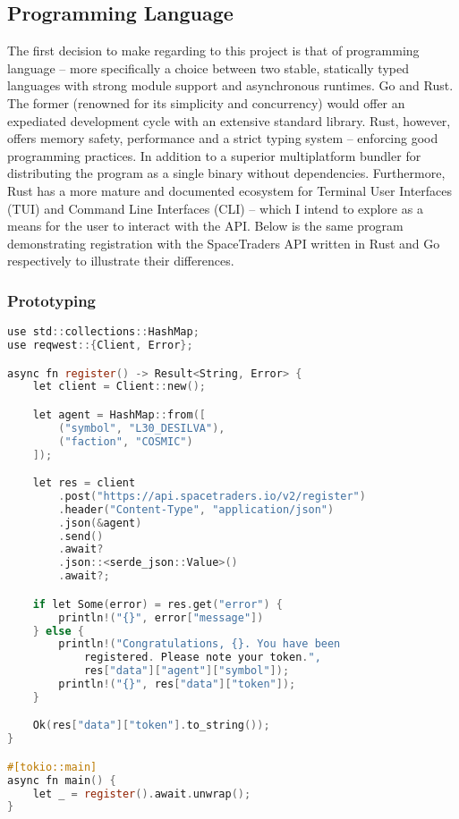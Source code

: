 \subsection{Programming Language}
The first decision to make regarding to this project is that of programming language – more specifically a choice between two stable, statically typed languages with strong module support and asynchronous runtimes. Go and Rust. The former (renowned for its simplicity and concurrency) would offer an expediated development cycle with an extensive standard library. Rust, however, offers memory safety, performance and a strict typing system – enforcing good programming practices. In addition to a superior multiplatform bundler for distributing the program as a single binary without dependencies. Furthermore, Rust has a more mature and documented ecosystem for Terminal User Interfaces (TUI) and Command Line Interfaces (CLI) – which I intend to explore as a means for the user to interact with the API. Below is the same program demonstrating registration with the SpaceTraders API written in Rust and Go respectively to illustrate their differences. 

\subsubsection{Prototyping}
\begin{lstlisting}[language=C]
use std::collections::HashMap;
use reqwest::{Client, Error};

async fn register() -> Result<String, Error> {
    let client = Client::new();

    let agent = HashMap::from([
        ("symbol", "L30_DESILVA"), 
        ("faction", "COSMIC")
    ]);

    let res = client
        .post("https://api.spacetraders.io/v2/register")
        .header("Content-Type", "application/json")
        .json(&agent)
        .send()
        .await?
        .json::<serde_json::Value>()
        .await?;

    if let Some(error) = res.get("error") {
        println!("{}", error["message"])
    } else {
        println!("Congratulations, {}. You have been 
            registered. Please note your token.", 
            res["data"]["agent"]["symbol"]);
        println!("{}", res["data"]["token"]);
    }

    Ok(res["data"]["token"].to_string());
}

#[tokio::main]
async fn main() {
    let _ = register().await.unwrap();
}

\end{lstlisting}

